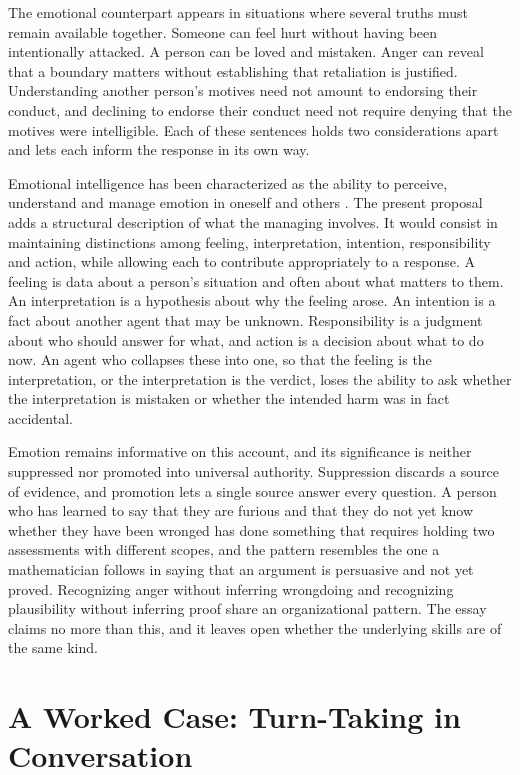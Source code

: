 \documentclass[12pt, a4paper]{article}
\begin{document}
The emotional counterpart appears in situations where several truths must remain available together. Someone can feel hurt without having been intentionally attacked. A person can be loved and mistaken. Anger can reveal that a boundary matters without establishing that retaliation is justified. Understanding another person's motives need not amount to endorsing their conduct, and declining to endorse their conduct need not require denying that the motives were intelligible. Each of these sentences holds two considerations apart and lets each inform the response in its own way.

Emotional intelligence has been characterized as the ability to perceive, understand and manage emotion in oneself and others \citep{salovey1990}. The present proposal adds a structural description of what the managing involves. It would consist in maintaining distinctions among feeling, interpretation, intention, responsibility and action, while allowing each to contribute appropriately to a response. A feeling is data about a person's situation and often about what matters to them. An interpretation is a hypothesis about why the feeling arose. An intention is a fact about another agent that may be unknown. Responsibility is a judgment about who should answer for what, and action is a decision about what to do now. An agent who collapses these into one, so that the feeling is the interpretation, or the interpretation is the verdict, loses the ability to ask whether the interpretation is mistaken or whether the intended harm was in fact accidental.

Emotion remains informative on this account, and its significance is neither suppressed nor promoted into universal authority. Suppression discards a source of evidence, and promotion lets a single source answer every question. A person who has learned to say that they are furious and that they do not yet know whether they have been wronged has done something that requires holding two assessments with different scopes, and the pattern resembles the one a mathematician follows in saying that an argument is persuasive and not yet proved. Recognizing anger without inferring wrongdoing and recognizing plausibility without inferring proof share an organizational pattern. The essay claims no more than this, and it leaves open whether the underlying skills are of the same kind.

\section{A Worked Case: Turn-Taking in Conversation}
\end{document}

